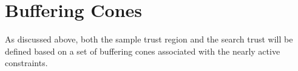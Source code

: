 





% 
% 
% 
% 
% 
% 



\section{Buffering Cones}
\label{buffering_cones}

As discussed above, both the sample trust region and the search trust will be defined based on a set of buffering cones associated with the nearly active constraints.   
  
